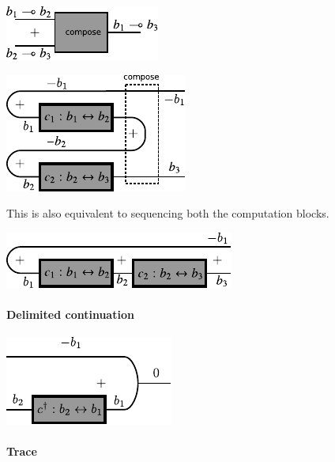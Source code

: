 \documentclass[preprint]{sigplanconf}
\begin{document}
\begin{center}
  \includegraphics{diagrams/compose1.pdf}
\end{center}

\begin{center}
  \includegraphics{diagrams/compose.pdf}
\end{center}

This is also equivalent to sequencing both the computation blocks. 

\begin{center}
  \includegraphics{diagrams/compose2.pdf}
\end{center}


\paragraph*{Delimited continuation}

\begin{center}
  \includegraphics{diagrams/delimc.pdf}
\end{center}

\paragraph*{Trace }

\end{document}
